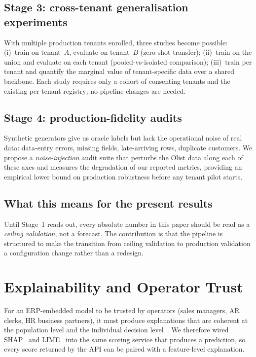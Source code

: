 \documentclass[conference]{IEEEtran}
\begin{document}
\subsection{Stage 3: cross-tenant generalisation experiments}
With multiple production tenants enrolled, three studies become possible:
(i)~train on tenant~$A$, evaluate on tenant~$B$ (zero-shot transfer);
(ii)~train on the union and evaluate on each tenant (pooled-vs-isolated
comparison); (iii)~train per tenant and quantify the marginal value of
tenant-specific data over a shared backbone. Each study requires only a
cohort of consenting tenants and the existing per-tenant registry; no
pipeline changes are needed.

\subsection{Stage 4: production-fidelity audits}
Synthetic generators give us oracle labels but lack the operational noise
of real data: data-entry errors, missing fields, late-arriving rows,
duplicate customers. We propose a \emph{noise-injection} audit suite that
perturbs the Olist data along each of these axes and measures the
degradation of our reported metrics, providing an empirical lower bound on
production robustness before any tenant pilot starts.

\subsection{What this means for the present results}
Until Stage~1 reads out, every absolute number in this paper should be read
as a \emph{ceiling validation}, not a forecast. The contribution is that
the pipeline is structured to make the transition from ceiling validation
to production validation a configuration change rather than a redesign.

\section{Explainability and Operator Trust}
\label{sec:xai}

For an ERP-embedded model to be trusted by operators (sales managers, AR
clerks, HR business partners), it must produce explanations that are
coherent at the population level and the individual decision
level~\cite{molnar2022interpretable,arrieta2020explainable,lipton2018mythos}.
We therefore wired SHAP~\cite{lundberg2017unified,lundberg2020local} and
LIME~\cite{ribeiro2016why} into the same scoring service that produces a
prediction, so every score returned by the API can be paired with a
feature-level explanation.
\end{document}
